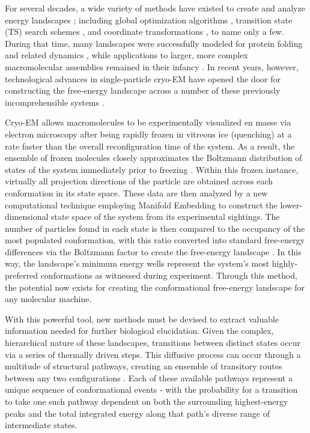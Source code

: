 \documentclass[twocolumn]{biophys-new}
\begin{document}
For several decades, a wide variety of methods have existed to create and analyze energy landscapes \cite{chapter7}; including global optimization algorithms \cite{wales1999}, transition state (TS) search schemes \cite{schram1998,truhlar1996}, and coordinate transformations \cite{pappu1998}, to name only a few. During that time, many landscapes were successfully modeled for protein folding and related dynamics \cite{hist1,hist2,hist3}, while applications to larger, more complex macromolecular assemblies remained in their infancy \cite{munro}. In recent years, however, technological advances in single-particle cryo-EM \cite{frank1,sigworth,frank2,frank3} have opened the door for constructing the free-energy landscape across a number of these previously incomprehensible systems \cite{ribo,dashti,frank4,frank5}.

Cryo-EM allows macromolecules to be experimentally visualized en masse via electron microscopy after being rapidly frozen in vitreous ice (quenching) at a rate faster than the overall reconfiguration time of the system. As a result, the ensemble of frozen molecules closely approximates the Boltzmann distribution of states of the system immediately prior to freezing \cite{whitford24}. Within this frozen instance, virtually all projection directions of the particle are obtained across each conformation in its state space. These data are then analyzed by a new computational technique employing Manifold Embedding \cite{dashti,frank4,frank5} to construct the lower-dimensional state space of the system from its experimental sightings. The number of particles found in each state is then compared to the occupancy of the most populated conformation, with this ratio converted into standard free-energy differences via the Boltzmann factor to create the free-energy landscape \cite{ribo}. In this way, the landscape's minimum energy wells represent the system's most highly-preferred conformations as witnessed during experiment. Through this method, the potential now exists for creating the conformational free-energy landscape for any molecular machine.

With this powerful tool, new methods must be devised to extract valuable information needed for further biological elucidation. Given the complex, hierarchical nature of these landscapes, transitions between distinct states occur via a series of thermally driven steps. This diffusive process can occur through a multitude of structural pathways, creating an ensemble of transitory routes between any two configurations \cite{whitford2012}. Each of these available pathways represent a unique sequence of conformational events - with the probability for a transition to take one such pathway dependent on both the surrounding highest-energy peaks \cite{munro} and the total integrated energy along that path's diverse range of intermediate states.
\end{document}
